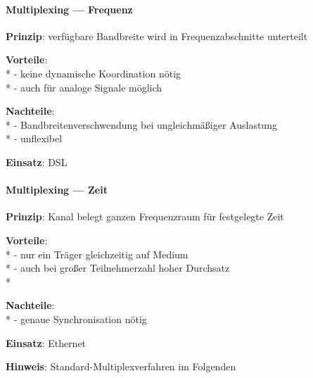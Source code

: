 \paragraph{Multiplexing --- Frequenz}
\begin{items}
  \item \textbf{Prinzip}: verfügbare Bandbreite wird in Frequenzabschnitte unterteilt
  \item \textbf{Vorteile}: \\*
    - keine dynamische Koordination nötig \\*
    - auch für analoge Signale möglich
  \item \textbf{Nachteile}: \\*
    - Bandbreitenverschwendung bei ungleichmäßiger Auslastung \\*
    - unflexibel
  \item \textbf{Einsatz}: DSL
\end{items}

\paragraph{Multiplexing --- Zeit}
\begin{items}
  \item \textbf{Prinzip}: Kanal belegt ganzen Frequenzraum für festgelegte Zeit
  \item \textbf{Vorteile}: \\*
    - nur ein Träger gleichzeitig auf Medium \\*
    - auch bei großer Teilnehmerzahl hoher Durchsatz \\*
  \item \textbf{Nachteile}: \\*
    - genaue Synchronisation nötig
  \item \textbf{Einsatz}: Ethernet
  \item \textbf{Hinweis}: Standard-Multiplexverfahren im Folgenden
\end{items}

